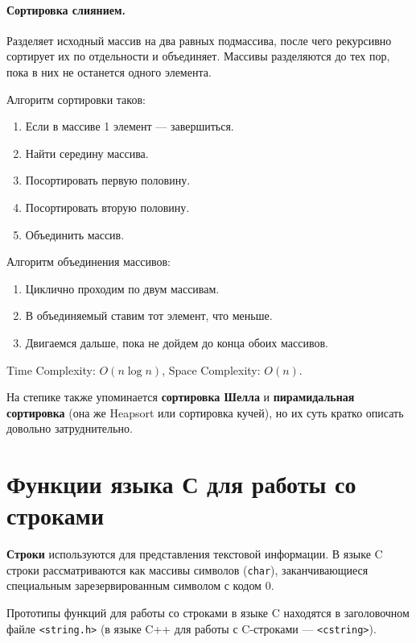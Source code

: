 \paragraph{Сортировка слиянием.}
Разделяет исходный массив на два равных подмассива, после чего рекурсивно сортирует их по отдельности и объединяет.
Массивы разделяются до тех пор, пока в них не останется одного элемента.

Алгоритм сортировки таков:
\begin{enumerate}
  \item Если в массиве 1 элемент --- завершиться.
  \item Найти середину массива.
  \item Посортировать первую половину.
  \item Посортировать вторую половину.
  \item Объединить массив.
\end{enumerate}

Алгоритм объединения массивов:
\begin{enumerate}
  \item Циклично проходим по двум массивам.
  \item В объединяемый ставим тот элемент, что меньше.
  \item Двигаемся дальше, пока не дойдем до конца обоих массивов.
\end{enumerate}

Time Complexity: $O(n\log n)$, Space Complexity: $O(n)$.

{\small На степике также упоминается \textbf{сортировка Шелла} и \textbf{пирамидальная сортировка}
(она же Heapsort или сортировка кучей), но их суть кратко описать довольно затруднительно.}

\section{Функции языка С для работы со строками}
\textbf{Строки} используются для представления текстовой информации.
В языке C строки рассматриваются как массивы символов (\verb|char|), заканчивающиеся
специальным зарезервированным символом с кодом 0.


Прототипы функций для работы со строками в языке C находятся в заголовочном файле \verb|<string.h>|
(в языке C++ для работы с C-строками --- \verb|<cstring>|).

